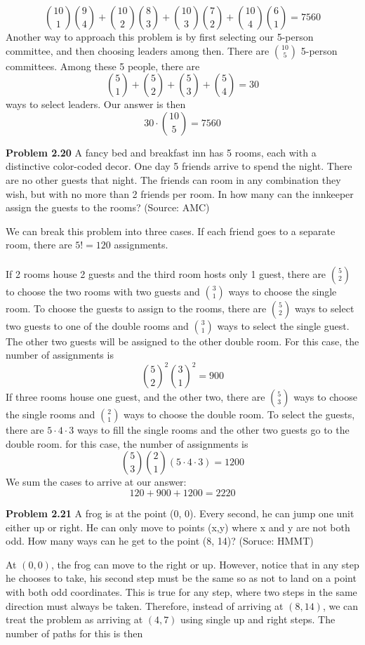 \documentclass[11pt]{scrartcl}
\begin{document}
$${10 \choose 1}{9 \choose 4}+{10 \choose 2}{8 \choose 3}+{10 \choose 3}{7 \choose 2}+{10 \choose 4}{6 \choose 1}=7560$$
Another way to approach this problem is by first selecting our 5-person committee, and then choosing leaders among then. There are $10 \choose 5$ 5-person committees. Among these 5 people, there are 
$${5 \choose 1}+{5 \choose 2}+{5 \choose 3}+{5 \choose 4}=30$$ 
ways to select leaders. Our answer is then 
$$30 \cdot {10 \choose 5}=7560$$
\begin{tcolorbox}
\textbf{Problem 2.20} A fancy bed and breakfast inn has 5 rooms, each with a distinctive color-coded decor. One day 5 friends arrive to spend the night. There are no other guests that night. The friends can room in any combination they wish, but with no more than 2 friends per room. In how many can the innkeeper assign the guests to the rooms? (Source: AMC)
\end{tcolorbox}
\noindent
We can break this problem into three cases. If each friend goes to a separate room, there are $5!=120$ assignments. \\
\\
\noindent 
If 2 rooms house 2 guests and the third room hosts only 1 guest, there are ${5 \choose 2}$ to choose the two rooms with two guests and ${3 \choose 1}$ ways to choose the single room. To choose the guests to assign to the rooms, there are ${5 \choose 2}$ ways to select two guests to one of the double rooms and $3 \choose 1$ ways to select the single guest. The other two guests will be assigned to the other double room. For this case, the number of assignments is 
$${5 \choose 2}^2{3 \choose 1}^2=900$$
\noindent 
If three rooms house one guest, and the other two, there are ${5 \choose 3}$ ways to choose the single rooms and ${2 \choose 1}$ ways to choose the double room. To select the guests, there are $5 \cdot 4 \cdot 3$ ways to fill the single rooms and the other two guests go to the double room. for this case, the number of assignments is 
$${5 \choose 3}{2 \choose 1}(5 \cdot 4 \cdot 3)=1200$$
We sum the cases to arrive at our answer: 
$$120+900+1200=2220$$
\begin{tcolorbox}
\textbf{Problem 2.21} A frog is at the point (0, 0). Every second, he can jump one unit either up or right. He can only move
to points (x,y) where x and y are not both odd. How many ways can he get to the point (8, 14)? (Soruce: HMMT)
\end{tcolorbox}
\noindent 
At $(0,0)$, the frog can move to the right or up. However, notice that in any step he chooses to take, his second step must be the same so as not to land on a point with both odd coordinates. This is true for any step, where two steps in the same direction must always be taken. Therefore, instead of arriving at $(8,14)$, we can treat the problem as arriving at $(4,7)$ using single up and right steps. The number of paths for this is then 
\end{document}
